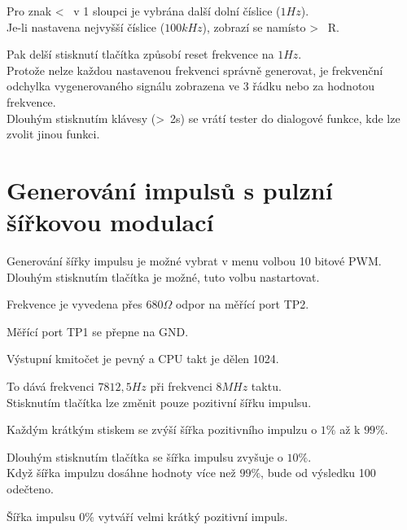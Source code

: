 Pro znak \textless~ v 1 sloupci je vybrána další dolní číslice (\(1Hz\)).
\\Je-li nastavena nejvyšší číslice (\(100kHz\)), zobrazí se namísto \textgreater~ R.

Pak delší stisknutí tlačítka způsobí reset frekvence na \(1Hz\).
\\Protože nelze každou nastavenou frekvenci správně generovat, je frekvenční odchylka vygenerovaného signálu zobrazena ve 3 řádku nebo za hodnotou frekvence.
\\Dlouhým stisknutím klávesy (\textgreater~2s) se vrátí tester do dialogové funkce,
kde lze zvolit jinou funkci.
\vspace*{-0.6cm}
\section{Generování impulsů s pulzní šířkovou modulací}
\vspace*{-0.3cm}
Generování šířky impulsu je možné vybrat v menu volbou 10 bitové PWM.
\\Dlouhým stisknutím tlačítka je možné, tuto volbu nastartovat.

Frekvence je vyvedena přes \(680\Omega\) odpor na měřící port TP2.

Měřící port TP1 se přepne na GND.

Výstupní kmitočet je pevný a CPU takt je dělen 1024.

To dává frekvenci \(7812,5Hz\) při frekvenci \(8MHz\) taktu.
\\Stisknutím tlačítka  lze změnit pouze pozitivní šířku impulsu.

Každým krátkým stiskem se zvýší šířka pozitivního impulzu  o \(1\%\) až k \(99\%\).

Dlouhým stisknutím tlačítka se šířka impulsu zvyšuje o \(10\%\).
\\Když šířka impulzu dosáhne hodnoty více než \(99\%\), bude od výsledku 100 odečteno.

Šířka impulsu \(0\%\)  vytváří velmi krátký pozitivní impuls.

